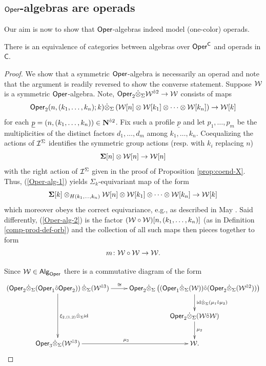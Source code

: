 \subsection{$\mathsf{Oper}$-algebras are operads}
Our aim is now to show that $\mathsf{Oper}$-algebras indeed model (one-color) operads. 

\begin{proposition} 
\label{Oper-is-operads}
There is an equivalence of categories between algebras over $\mathsf{Oper}^{\mathsf{C}}$ and operads in $\mathsf{C}$.
\end{proposition}

\begin{proof} 
We show that a symmetric $\mathsf{Oper}$-algebra is necessarily an operad and note that the argument is readily reversed to show the converse statement. Suppose $\mathcal{W}$ is a symmetric $\mathsf{Oper}$-algebra. Note, $\mathsf{Oper}_2\dot{\otimes}_{\Sigma}  \mathcal{W}^{\hat{\circ} 2}\to \mathcal{W}$ consists of maps \begin{equation} \label{Oper-alg-1}
    \mathsf{Oper}_2 (n, (k_1,\dots,k_n);k)\dot{\otimes}_{\Sigma} \left( \mathcal{W}[n] \otimes \mathcal{W}[k_1] \otimes \cdots \otimes \mathcal{W}[k_n]\right) \to \mathcal{W}[k]
\end{equation}
for each $\underline{p}=(n,(k_1,\dots,k_n))\in\mathbf{N}^{\hat{\circ}2}$. Fix such a profile $\underline{p}$ and let $p_1,\dots,p_m$ be the multiplicities of the distinct factors $d_1,\dots,d_m$ among $k_1,\dots,k_n$. Coequalizing the actions of $\mathcal{I}^{\Sigma}$ identifies the symmetric group actions (resp. with $k_i$ replacing $n$) \[ \mathbf{\Sigma}[n] \otimes \mathcal{W}[n]\to \mathcal{W}[n]\] with the right action of $\mathcal{I}^{\Sigma}$ given in the proof of Proposition \ref{prop:coend-X}. Thus, (\ref{Oper-alg-1}) yields $\Sigma_k$-equivariant map of the form\begin{equation}
\label{Oper-alg-2}
    \mathbf{\Sigma}[k] \otimes_{H(k_1,\dots,k_n)} \mathcal{W}[n]\otimes \mathcal{W}[k_1]\otimes \cdots \otimes \mathcal{W}[k_n]\to \mathcal{W}[k]
\end{equation} which moreover obeys the correct equivariance, e.g.,  as  described in May \cite{May}. Said differently, (\ref{Oper-alg-2}) is the factor $(\mathcal{W}\circ \mathcal{W})[n,(k_1,\dots,k_n)]$ (as in Definition \ref{comp-prod-def-orb}) and the collection of all such maps then pieces together to form \[m\colon \mathcal{W}\circ \mathcal{W}\to \mathcal{W}.\] 

Since $\mathcal{W}\in {\mathsf{Alg}_{\mathcal{\mathsf{Oper}}}}$ there is a commutative diagram of the form
\[ \xymatrix{
    \left( \Oper_2 \tensordot_{\Sigma}  (\Oper_1 \circhat \Oper_2) \right) \tensordot_{\Sigma}  (\Cal{W}^{\circhat 3})
    \ar[r]^<(.1){\cong} \ar[dd]^{\xi_{2,(1,2)}\tensordot_{\Sigma}  \id}
    &
    \Oper_2 \tensordot_{\Sigma}  \left( ( \Oper_1\tensordot_{\Sigma}  (\Cal{W})) \circhat (\Oper_2 \tensordot_{\Sigma}  (\Cal{W}^{\circhat 2})) \right) \ar[d]^{\id \tensordot_{\Sigma} (\mu_1\circhat \mu_2)}
    \\
    & \Oper_2 \tensordot_{\Sigma}  (\Cal{W}\circhat \Cal{W}) \ar[d]^{\mu_2}
    \\
    \Oper_3 \tensordot_{\Sigma}  (\Cal{W}^{\circhat 3}) \ar[r]^{\mu_3} & \Cal{W}. }
\] 


\end{proof}
